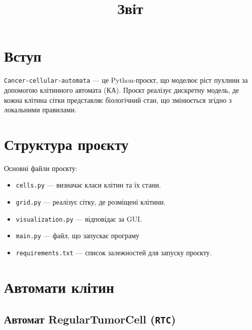 \documentclass[12pt]{article}
\title{Звіт}
\begin{document}
\section{Вступ}

\texttt{Cancer-cellular-automata} --- це Python-проєкт, що моделює ріст пухлини за допомогою клітинного автомата (КА). Проєкт реалізує дискретну модель, де кожна клітина сітки представляє біологічний стан, що змінюється згідно з локальними правилами.

\section{Структура проєкту}

Основні файли проєкту:

\begin{itemize}
  \item \texttt{cells.py} --- визначає класи клітин та їх стани.
  \item \texttt{grid.py} --- реалізує сітку, де розміщені клітини.
  \item \texttt{visualization.py} --- відповідає за GUI.
  \item \texttt{main.py} --- файл, що запускає програму
  \item \texttt{requirements.txt} --- список залежностей для запуску проєкту.
\end{itemize}

\section{Автомати клітин}
\subsection{Автомат RegularTumorCell (\texttt{RTC})}
\end{document}
